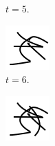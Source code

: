 \begin{figure}
\begin{subfigure}{.1\textwidth}
        \caption{$t=5$.}
    \end{subfigure}
    \begin{subfigure}{.1\textwidth}
        \includegraphics[width=\textwidth]{graphics/work-artifacts/marked/full/3/test-5.png}
        \caption{$t=6$.}
    \end{subfigure}
    \begin{subfigure}{.1\textwidth}
        \includegraphics[width=\textwidth]{graphics/work-artifacts/marked/full/3/test-6.png}

\end{subfigure}
\end{figure}
